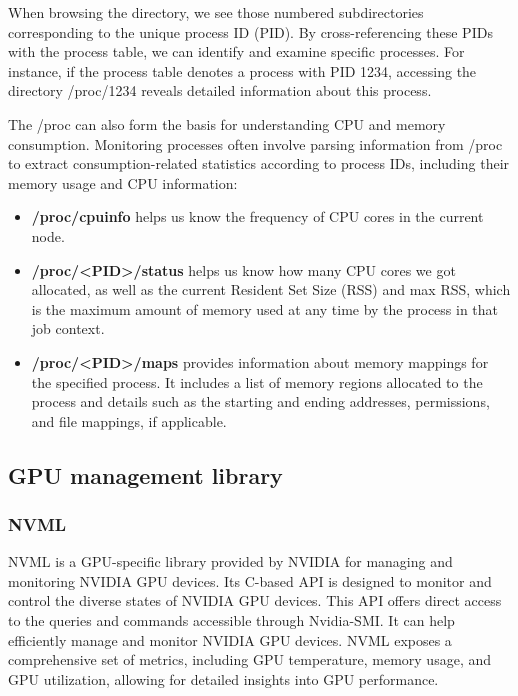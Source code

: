 

When browsing the directory, we see those numbered subdirectories corresponding to the unique process ID (PID). By cross-referencing these PIDs with the process table, we can identify and examine specific processes. For instance, if the process table denotes a process with PID 1234, accessing the directory /proc/1234 reveals detailed information about this process.
    
The /proc can also form the basis for understanding CPU and memory consumption. Monitoring processes often involve parsing information from /proc to extract consumption-related statistics according to process IDs, including their memory usage and CPU information:

\begin{itemize}
    \item \textbf{/proc/cpuinfo} helps us know the frequency of CPU cores in the current node.
    \item \textbf{/proc/<PID>/status} helps us know how many CPU cores we got allocated, as well as the current Resident Set Size (RSS) and max RSS, which is the maximum amount of memory used at any time by the process in that job context.
    \item \textbf{/proc/<PID>/maps} provides information about memory mappings for the specified process. It includes a list of memory regions allocated to the process and details such as the starting and ending addresses, permissions, and file mappings, if applicable.
\end{itemize}

\subsection{GPU management library}
\subsubsection{NVML}
NVML \cite{nvml} is a GPU-specific library provided by NVIDIA for managing and monitoring NVIDIA GPU devices. Its C-based API is designed to monitor and control the diverse states of NVIDIA GPU devices. This API offers direct access to the queries and commands accessible through Nvidia-SMI. It can help efficiently manage and monitor NVIDIA GPU devices. NVML exposes a comprehensive set of metrics, including GPU temperature, memory usage, and GPU utilization, allowing for detailed insights into GPU performance.

